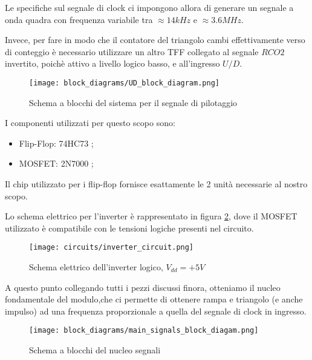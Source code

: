 Le specifiche sul segnale di clock ci impongono allora di generare un segnale a onda quadra
con frequenza variabile tra $\approx14kHz$ e $\approx3.6MHz$.

Invece, per fare in modo che il contatore del triangolo cambi effettivamente verso di conteggio
è necessario utilizzare un altro TFF collegato al segnale $RCO2$ invertito, poichè attivo a
livello logico basso, e all'ingresso $U/D$.
\medskip

\begin{figure}[ht]
    \centering
    \texttt{[image: block\_diagrams/UD\_block\_diagram.png]}
    \caption{Schema a blocchi del sistema per il segnale di pilotaggio}
    \label{UD_block_diagram}
\end{figure}

I componenti utilizzati per questo scopo sono:

\begin{itemize}
    \item Flip-Flop: 74HC73 \cite{74hc73};
    \item MOSFET: 2N7000 \cite{2n7000};
\end{itemize}

Il chip utilizzato per i flip-flop fornisce esattamente le 2 unità necessarie al nostro scopo.

Lo schema elettrico per l'inverter è rappresentato in figura \ref{inverter_circuit}, dove il
MOSFET utilizzato è compatibile con le tensioni logiche presenti nel circuito.
\medskip

\begin{figure}[ht]
    \centering
    \texttt{[image: circuits/inverter\_circuit.png]}
    \caption{Schema elettrico dell'inverter logico, $V_{dd}=+5V$}
    \label{inverter_circuit}
\end{figure}

A questo punto collegando tutti i pezzi discussi finora, otteniamo il nucleo fondamentale
del modulo,che ci permette di ottenere rampa e triangolo (e anche impulso) ad una frequenza
proporzionale a quella del segnale di clock in ingresso.
\medskip

\begin{figure}[ht]
    \centering
    \texttt{[image: block\_diagrams/main\_signals\_block\_diagam.png]}
    \caption{Schema a blocchi del nucleo segnali}
    \label{main_signals_block_diagram}
\end{figure}


